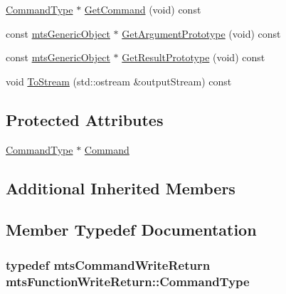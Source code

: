 \begin{DoxyCompactItemize}
\item 
\hyperlink{classmts_function_write_return_ac896d3571d680531a898daf398774881}{Command\+Type} $\ast$ \hyperlink{classmts_function_write_return_a9538b7e6a7bc2656be89e70b9cc6f2f2}{Get\+Command} (void) const 
\item 
const \hyperlink{classmts_generic_object}{mts\+Generic\+Object} $\ast$ \hyperlink{classmts_function_write_return_a36b02957cee1e6f144377862aa5c8819}{Get\+Argument\+Prototype} (void) const 
\item 
const \hyperlink{classmts_generic_object}{mts\+Generic\+Object} $\ast$ \hyperlink{classmts_function_write_return_a13ce482e4e34283e27f63654a61c3e67}{Get\+Result\+Prototype} (void) const 
\item 
void \hyperlink{classmts_function_write_return_a4cb7b8d402ca8863ccd6524253cb735f}{To\+Stream} (std\+::ostream \&output\+Stream) const 
\end{DoxyCompactItemize}
\subsection*{Protected Attributes}
\begin{DoxyCompactItemize}
\item 
\hyperlink{classmts_function_write_return_ac896d3571d680531a898daf398774881}{Command\+Type} $\ast$ \hyperlink{classmts_function_write_return_af81a9d61a27ec87109ad4cf07b7ba6ea}{Command}
\end{DoxyCompactItemize}
\subsection*{Additional Inherited Members}


\subsection{Member Typedef Documentation}
\hypertarget{classmts_function_write_return_ac896d3571d680531a898daf398774881}{}
\subsubsection[{Command\+Type}]{\setlength{\rightskip}{0pt plus 5cm}typedef {\bf mts\+Command\+Write\+Return} {\bf mts\+Function\+Write\+Return\+::\+Command\+Type}}\label{classmts_function_write_return_ac896d3571d680531a898daf398774881}


